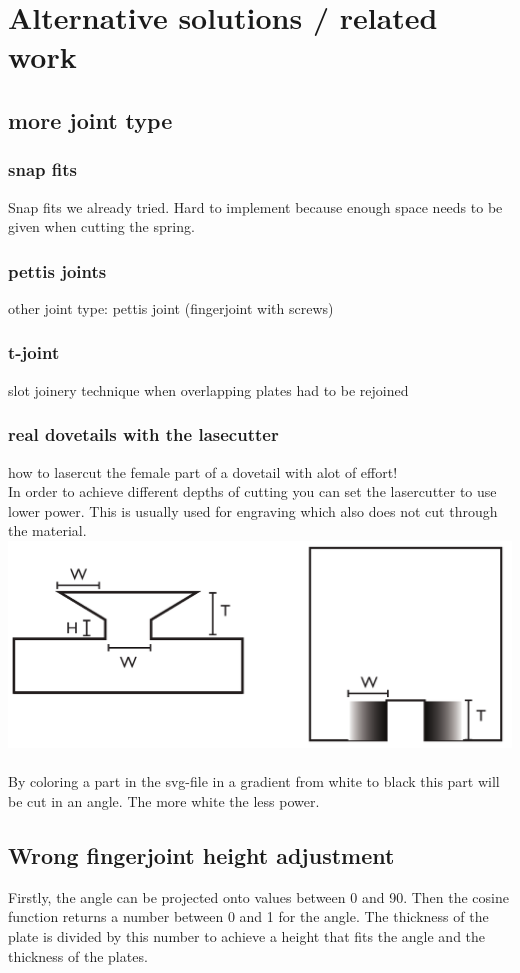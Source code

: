 \documentclass[../ClassicThesis.tex]{subfiles}
\begin{document}
    

\section{Alternative solutions / related work}
\subsection{more joint type}
\subsubsection{snap fits}
Snap fits we already tried. Hard to implement because enough space needs to be given when cutting the spring.
\subsubsection{pettis joints}
other joint type: pettis joint (fingerjoint with screws)
\subsubsection{t-joint}
slot joinery technique when overlapping plates had to be rejoined
\subsubsection{real dovetails with the lasecutter}
how to lasercut the female part of a dovetail with alot of effort!\\
In order to achieve different depths of cutting you can set the lasercutter to use lower power. This is usually used for engraving which also does not cut through the material.\\
\includegraphics[width=0.5\columnwidth]{Images/06-2-joints-schwalbeMitLaser.png}\\
\\
By coloring a part in the svg-file in a gradient from white to black this part will be cut in an angle. The more white the less power.

\subsection{Wrong fingerjoint height adjustment}
Firstly, the angle can be projected onto values between 0 and 90. Then the cosine function returns a number between 0 and 1 for the angle. The thickness of the plate is divided by this number to achieve a height that fits the angle and the thickness of the plates. 
\end{document}
